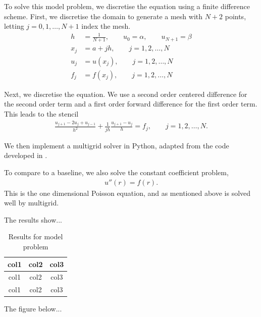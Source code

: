 To solve this model problem, we discretise the equation using a finite difference scheme.
First, we discretise the domain to generate a mesh with $N+2$ points, letting $j=0,1,\ldots,N+1$ index the mesh.
\begin{align}
	h &= \frac{1}{N+1}, \qquad u_0 = \alpha, \qquad u_{N+1} = \beta \\
	x_j &= a + jh, \qquad j=1,2,\ldots,N \\
	u_j &= u(x_j), \qquad j=1,2,\ldots,N \\
	f_j &= f(x_j), \qquad j=1,2,\ldots,N
\end{align}

Next, we discretise the equation.
We use a second order centered difference for the second order term and a first order forward difference for the first order term.
This leads to the stencil
\begin{align}
	\frac{u_{j+1} - 2u_{j} + u_{j-1}}{h^2} + \frac{1}{jh}\frac{u_{j+1}-u_{j}}{h} = f_j, \qquad j=1,2,\ldots,N.
\end{align}


We then implement a multigrid solver in Python, adapted from the code developed in \cite{weir}.

To compare to a baseline, we also solve the constant coefficient problem,
\begin{align}
	u''(r) = f(r).
\end{align}
This is the one dimensional Poisson equation, and as mentioned above is solved well by multigrid.

The results show...

\begin{table}[h]
	\centering
	\begingroup
	\renewcommand*{\arraystretch}{1.5}
	\begin{tabular}{c|c|c}
		col1 & col2 & col3 \\ \hline
		col1 & col2 & col3 \\
		col1 & col2 & col3 \\
	\end{tabular}
	\endgroup
	\caption{Results for model problem}
\end{table}

The figure below...

